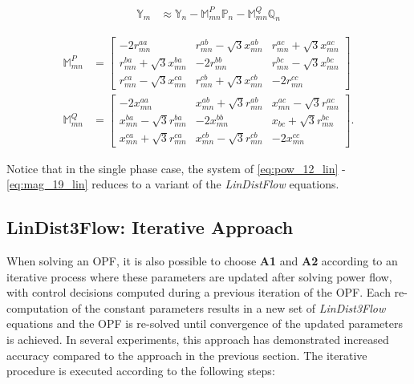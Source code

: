 \begin{align}
	\mathbb{Y}_{m} &\approx \mathbb{Y}_{n} - \mathbb{M}_{mn}^{P} \mathbb{P}_{n} - \mathbb{M}_{mn}^{Q} \mathbb{Q}_{n} \label{eq:mag_17_lin}
\end{align}

\begin{align}
	\mathbb{M}_{mn}^{P} &=
	\begin{bmatrix}
		-2 r_{mn}^{aa} & r_{mn}^{ab} - \sqrt{3} x_{mn}^{ab} & r_{mn}^{ac} + \sqrt{3} x_{mn}^{ac} \\
		r_{mn}^{ba} + \sqrt{3} x_{mn}^{ba} & -2 r_{mn}^{bb} & r_{mn}^{bc} - \sqrt{3} x_{mn}^{bc} \\
		r_{mn}^{ca} - \sqrt{3} x_{mn}^{ca} & r_{mn}^{cb} + \sqrt{3} x_{mn}^{cb} & -2 r_{mn}^{cc}
	\end{bmatrix} \label{eq:mag_18_lin}\\
	\mathbb{M}_{mn}^{Q} &=
	\begin{bmatrix}
		-2 x_{mn}^{aa} & x_{mn}^{ab} + \sqrt{3} r_{mn}^{ab} & x_{mn}^{ac} - \sqrt{3} r_{mn}^{ac} \\
		x_{mn}^{ba} -\sqrt{3} r_{mn}^{ba} & -2 x_{mn}^{bb} & x_{bc} + \sqrt{3} r_{mn}^{bc}\\
		x_{mn}^{ca} + \sqrt{3} r_{mn}^{ca} & x_{mn}^{cb} -\sqrt{3} r_{mn}^{cb} & -2 x_{mn}^{cc}
	\end{bmatrix} \label{eq:mag_19_lin}.
\end{align}

Notice that in the single phase case, the system of \eqref{eq:pow_12_lin} - \eqref{eq:mag_19_lin} reduces to a variant of the \emph{LinDistFlow} equations.

\subsection{LinDist3Flow: Iterative Approach}
\label{subsec:analysis_iter}

When solving an OPF, it is also possible to choose \textbf{A1} and \textbf{A2} according to an iterative process where these parameters are updated after solving power flow, with control decisions computed during a previous iteration of the OPF.  Each re-computation of the constant parameters results in a new set of \emph{LinDist3Flow} equations and the OPF is re-solved until convergence of the updated parameters is achieved.  In several experiments, this approach has demonstrated increased accuracy compared to the approach in the previous section.  The iterative procedure is executed according to the following steps:


